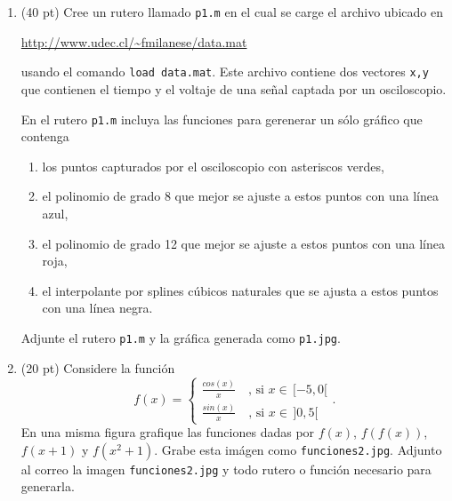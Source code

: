 \documentclass[11pt]{article}
\begin{document}
\begin{enumerate}
\item (40 pt) Cree un rutero llamado \texttt{p1.m} en el cual se carge el archivo ubicado en
\begin{center}
\url{http://www.udec.cl/~fmilanese/data.mat}
\end{center}
usando el comando \texttt{load data.mat}. Este archivo contiene dos 
vectores \texttt{x,y} que contienen el tiempo y el voltaje de una señal captada por un osciloscopio.

En el rutero \texttt{p1.m} incluya las funciones para gerenerar un sólo gr\'afico que contenga
\begin{enumerate}
	\item los puntos capturados por el osciloscopio con asteriscos verdes,
    \item el polinomio de grado 8 que mejor se ajuste a estos puntos con una línea azul,
    \item el polinomio de grado 12 que mejor se ajuste a estos puntos con una línea roja,
    \item el interpolante por splines c\'ubicos naturales que se ajusta a estos puntos con una línea negra.
\end{enumerate}
Adjunte el rutero \texttt{p1.m} y la gr\'afica generada como \texttt{p1.jpg}.




\item (20 pt) Considere la funci\'on
$$
f(x)=
\begin{cases}
\frac{cos(x)}{x} \quad  \text{, si } x\in\,[-5,0[\\
\frac{sin(x)}{x} \quad  \text{, si } x\in\,]0,5[
\end{cases}.
$$
En una misma figura grafique las funciones dadas por $f(x)$, $f(f(x))$, $f(x+1)$ y $f(x^2+1)$. Grabe esta im\'agen como \texttt{funciones2.jpg}. Adjunto al correo la imagen \texttt{funciones2.jpg} y todo rutero o funci\'on necesario para generarla.


\end{enumerate}
\end{document}
